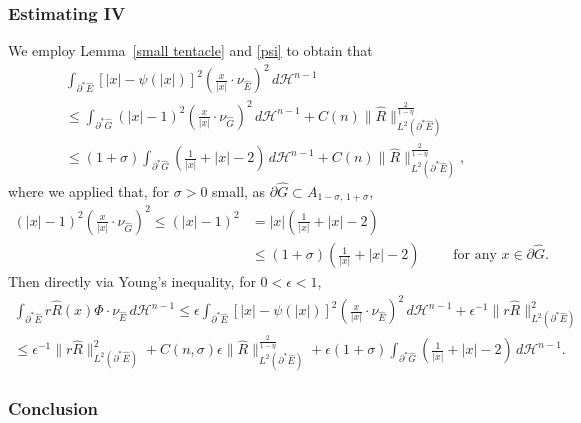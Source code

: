 \documentclass[reqno,11pt]{amsart}
\def\ez{\epsilon}
\def\sz{\sigma}
\numberwithin{equation}{section}
\theoremstyle{remark}
\begin{document}
\subsubsection*{Estimating IV}
We employ  Lemma~\ref{small tentacle} and \eqref{psi} to obtain that
\begin{align*}
&\int_{\partial^*\hat  E} [|x|-\psi(|x|)]^2 \left(\frac{x}{|x|}\cdot \nu_{\hat E}\right)^2 \, d\mathscr H^{n-1}\\
& \leq  \int_{\partial^*\hat G} (|x|-1)^2 \left(\frac{x}{|x|}\cdot \nu_{\hat G}\right)^2 \, d\mathscr H^{n-1}   + C(n)  \|\hat  R\|_{L^2(\partial^* \hat E)}^{\frac{2}{1-\eta}}\\
& \leq  (1+ \sz) \int_{\partial^* \hat G}  \left(\frac{1}{|x|}+|x|-2\right)\, d\mathscr H^{n-1}  +  C(n) \|\hat  R\|_{L^2(\partial^* \hat E)}^{\frac{2}{1-\eta}},
\end{align*}
where we applied that, for $\sz>0$ small, as $\partial \hat G\subset A_{1-\sz,\,1+\sz}$, 
\begin{align*}
    (|x|-1)^2 \left(\frac{x}{|x|}\cdot \nu_{\hat G}\right)^2  \le  (|x|-1)^2 &  = |x|  \left(\frac{1}{|x|}+|x|-2\right)\\
   &  \le (1+\sz)   \left(\frac{1}{|x|}+|x|-2\right) \quad\quad  \text{ for any }  x\in \partial \hat G.
\end{align*} 
Then directly via Young's inequality, for $0<\ez<1$, 
\begin{multline}
  \int_{\partial^* \hat E} r \hat R(x)  \Phi\cdot \nu_{\hat E} \,d\mathscr H^{n-1} 
\le  \ez \int_{\partial^*\hat  E} [|x|-\psi(|x|)]^2 \left(\frac{x}{|x|}\cdot \nu_{\hat E}\right)^2 \, d\mathscr H^{n-1} + \ez^{-1} \|r\hat R\|^2_{L^2(\partial^* \hat E)}   \\
\le  \ez^{-1}  \|r \hat  R\|^2_{L^2(\partial^* \hat  E)} +C(n,\sz) \ez  \|\hat R\|_{L^2(\partial^* \hat E)}^{\frac{2}{1-\eta}} +\ez (1+ \sz) \int_{\partial^* \hat G}  \left( \frac{1}{|x|}+|x|-2\right)\, d\mathscr H^{n-1}.    \label{R term}
\end{multline}


\subsubsection*{Conclusion}
\end{document}

